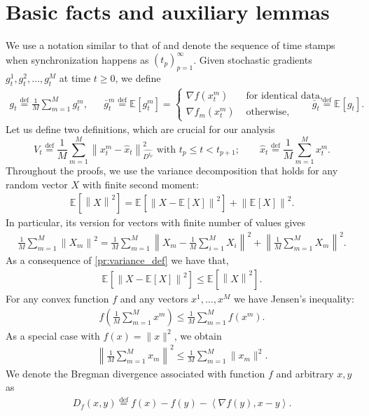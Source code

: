 \documentclass[sn-mathphys,Numbered]{sn-jnl}%
\renewcommand{\|}{\parallel}
\newcommand\ec[2][]{\ensuremath{\mathbb{E}_{#1} \left[#2\right]}}
\newcommand\ecn[3][]{\ec[#1]{\norm{#2}^2_{#3}}}
\newcommand\ev[1]{\left \langle #1 \right \rangle}
\newcommand\br[1]{\left ( #1 \right )}
\newcommand{\norm}[1]{\left\lVert#1\right\rVert}
\newcommand{\sqn}[1]{{\left\lVert#1\right\rVert}^2}
\newcommand{\eqdef}{\overset{\text{def}}{=}}
\newcommand{\avemm}{\frac{1}{M}\sum\limits_{m=1}^M}
\newcommand{\aveim}{\frac{1}{M}\sum_{i=1}^M}
\renewcommand {\*} {\ast}
\begin{document}
\section{Basic facts and auxiliary lemmas}
We use a notation similar to that of \cite{stich2018local} and denote the sequence of time stamps when synchronization happens as  $(t_{p})_{p=1}^{\infty}$. Given stochastic gradients $g_t^1, g_t^2, \ldots, g_t^M$ at time $t \geq 0$, we define
\begin{align*}
    g_t \eqdef \avemm g_t^m, && \bar{g}_t^m \eqdef \ec{g_t^m} = \begin{cases}
     \nabla f(x_t^m) & \text { for identical data, }  \\
     \nabla f_m (x_t^m) & \text { otherwise, } 
\end{cases} && \bar{g}_t \eqdef \ec{g_t}.
\end{align*}
Let us define two definitions, which are crucial for our analysis
 $$V_t \eqdef \avemm \sqn{x_t^m - \hat{x}_t}_{\hat{D^{t_p}}} \text{ with } t_p \leq t < t_{p+1}; \qquad \hat{x}_t \eqdef \avemm x_t^m.$$
Throughout the proofs, we use the variance decomposition that holds for any random vector $X$ with finite second moment:
\begin{align}
    \label{pr:variance_def}
    \ecn {X}{} = \ecn { X - \ec{X} }{} + \sqn{\ec{X}}.
\end{align}
In particular, its version for vectors with finite number of values gives
\begin{align}
    \avemm \norm{X_m}^2
    = \avemm \norm{X_m - \aveim X_i}^2 + \norm{\avemm X_m}^2.\label{pr:variance_m}
\end{align}
As a consequence of \eqref{pr:variance_def} we have that,
\begin{align}
    \label{pr:variance_sqnorm_upperbound}
    \ecn{X - \ec{X}}{} \leq \ecn{X}{}.
\end{align}
For any convex function $f$ and any vectors $x^1,\dotsc, x^M$ we have Jensen's inequality:
\begin{align}
\label{pr:jensen}
    f\br{\avemm x^m}
    \le \avemm f(x^m).
\end{align}
As a special case with $f(x)=\|x\|^2$, we obtain
\begin{align}
\label{pr:spec-jensen}
    \norm{\avemm x_m}^2
    \le \avemm \|x_m\|^2.
\end{align}
\noindent We denote the Bregman divergence associated with function $f$ and arbitrary $x, y$ as
\begin{align*}
D_f(x, y)
\eqdef f(x) - f(y) - \ev{\nabla f(y), x - y}.
\end{align*}    
\end{document}

